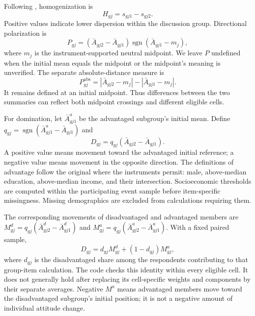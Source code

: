 \documentclass[11pt]{article}
\begin{document}
Following \citet{original}, homogenization is
\begin{equation}
H_{gj}=s_{gj1}-s_{gj2}.
\end{equation}
Positive values indicate lower dispersion within the discussion group. Directional
polarization is
\begin{equation}
P_{gj}=(\bar A_{gj2}-\bar A_{gj1})\operatorname{sgn}(\bar A_{gj1}-m_j),
\end{equation}
where $m_j$ is the instrument-supported neutral midpoint. We leave $P$ undefined
when the initial mean equals the midpoint or the midpoint's meaning is unverified.
The separate absolute-distance measure is
\begin{equation}
P^{\mathrm{abs}}_{gj}=|\bar A_{gj2}-m_j|-|\bar A_{gj1}-m_j|.
\end{equation}
It remains defined at an initial midpoint. Thus differences between the two
summaries can reflect both midpoint crossings and different eligible cells.

For domination, let $\bar A^a_{gj1}$ be the advantaged subgroup's initial mean.
Define $q_{gj}=\operatorname{sgn}(\bar A^a_{gj1}-\bar A_{gj1})$ and
\begin{equation}
D_{gj}=q_{gj}(\bar A_{gj2}-\bar A_{gj1}).
\end{equation}
A positive value means movement toward the advantaged initial reference; a negative
value means movement in the opposite direction. The definitions of advantage
follow the original where the instruments permit: male, above-median education,
above-median income, and their intersection. Socioeconomic thresholds are computed
within the participating event sample before item-specific missingness. Missing
demographics are excluded from calculations requiring them.

The corresponding movements of disadvantaged and advantaged members are
$M^d_{gj}=q_{gj}(\bar A^d_{gj2}-\bar A^d_{gj1})$ and
$M^a_{gj}=q_{gj}(\bar A^a_{gj2}-\bar A^a_{gj1})$. With a fixed paired sample,
\begin{equation}
D_{gj}=d_{gj}M^d_{gj}+(1-d_{gj})M^a_{gj},
\end{equation}
where $d_{gj}$ is the disadvantaged share among the respondents contributing to
that group-item calculation. The code checks this identity within every eligible
cell. It does not generally hold after replacing its cell-specific weights and
components by their separate averages. Negative $M^a$ means advantaged members
move toward the disadvantaged subgroup's initial position; it is not a negative
amount of individual attitude change.
\end{document}
